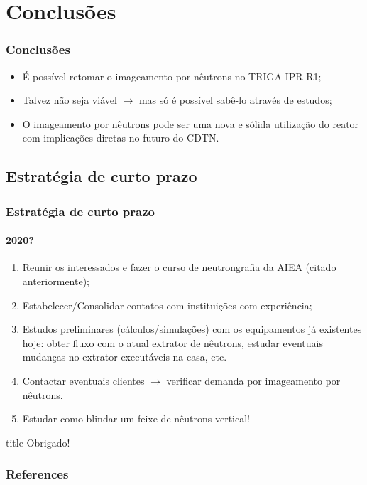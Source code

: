 \documentclass[svgnames,smaller,table]{beamer}
\begin{document}
\section{Conclusões}
\begin{frame}[fragile] %
  \frametitle{Conclusões}
  \begin{itemize}
  \item É possível retomar o imageamento por nêutrons no TRIGA IPR-R1;
  \item Talvez não seja viável $\rightarrow$ mas só é possível sabê-lo através de estudos;
  \item O imageamento por nêutrons pode ser uma nova e sólida utilização do reator com implicações diretas no futuro do CDTN.
  \end{itemize}
\end{frame}

\subsection{Estratégia de curto prazo}
\begin{frame}
  \frametitle{Estratégia de curto prazo}
  \framesubtitle{2020?}
  \begin{enumerate}
  \item Reunir os interessados e fazer o curso de neutrongrafia da AIEA (citado anteriormente);
  \item Estabelecer/Consolidar contatos com instituições com experiência;
  \item Estudos preliminares (cálculos/simulações) com os equipamentos já existentes hoje: obter fluxo com o atual extrator de nêutrons, estudar eventuais mudanças no extrator executáveis na casa, etc.
  \item Contactar eventuais clientes $\rightarrow$ verificar demanda por imageamento por nêutrons.
  \item \alert{Estudar como blindar um feixe de nêutrons vertical!} \pause \cite{Wilson2017}
  \end{enumerate}
\end{frame}



\begin{frame}
 \vfill
  \begin{beamercolorbox}[center]{title}
     \Huge{Obrigado!}
  \end{beamercolorbox}
  \vfill
\end{frame}

\begin{frame}
    \frametitle{References}
    
    
\end{frame}
\end{document}
